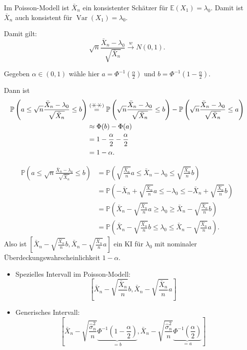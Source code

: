 \documentclass{tstextbook}
\DeclareMathOperator{\Var}{Var}
\newcommand{\E}{\mathbb E}
\newcommand{\Prob}{\mathbb P}
\begin{document}
\begin{example}
	
	Im Poisson-Modell ist $ \bar{X}_n $ ein konsistenter Schätzer für $ \E(X_1) = \lambda_0 $. Damit ist $ \bar{X}_n $ auch konsistent für $ \Var(X_1) = \lambda_0 $. 
	
	Damit gilt: 
	\[
	\sqrt{n} \frac{\bar{X}_n-\lambda_0}{\sqrt{\bar{X}_n}} \overset{w}{\longrightarrow} N(0,1). \tag{$\hexstar\hexstar$}
	\]
	
	Gegeben $ \alpha \in (0,1) $ wähle hier $ a = \Phi^{-1} \left(\frac{\alpha}{2}\right) $ und $ b = \Phi^{-1} \left( 1 - \frac{\alpha}{2} \right) $. 
	
	Dann ist 
	\[
	\begin{aligned}
		\Prob\left(a \le \sqrt{n} \frac{\bar{X}_n - \lambda_0}{\sqrt{\bar{X}_n}} \le b \right) & \overset{(\hexstar\hexstar)}{=} \Prob\left(\sqrt{n} \frac{\bar{X}_n - \lambda_0}{\sqrt{\bar{X}_n}} \le b \right) - \Prob\left(\sqrt{n} \frac{\bar{X}_n - \lambda_0}{\sqrt{\bar{X}_n}} \le a \right) \\
		& \approx \Phi (b) - \Phi (a) \\
		& = 1 - \frac{\alpha}{2} - \frac{\alpha}{2} \\
		& = 1 - \alpha.
	\end{aligned}
	\]
	
	\[
	\begin{aligned}
		\Prob\left(a \le \sqrt{n} \frac{\bar{X}_n - \lambda_0}{\sqrt{\bar{X}_n}} \le b \right) & = \Prob \left(\sqrt{\frac{\bar{X}_n}{n}} a \le \bar{X}_n - \lambda_0 \le \sqrt{\frac{\bar{X}_n}{n}} b \right) \\
		& = \Prob \left(- \bar{X}_n + \sqrt{\frac{\bar{X}_n}{n}} a \le  - \lambda_0 \le - \bar{X}_n + \sqrt{\frac{\bar{X}_n}{n}} b \right) \\
		& = \Prob \left(\bar{X}_n - \sqrt{\frac{\bar{X}_n}{n}} a \ge   \lambda_0 \ge  \bar{X}_n - \sqrt{\frac{\bar{X}_n}{n}} b \right) \\
		& = \Prob \left(\bar{X}_n - \sqrt{\frac{\bar{X}_n}{n}} b \le   \lambda_0 \le  \bar{X}_n - \sqrt{\frac{\bar{X}_n}{n}} a \right).
	\end{aligned}
	\]
	Also ist $ \left[\bar{X}_n - \sqrt{\frac{\bar{X}_n}{n}} b, \bar{X}_n - \sqrt{\frac{\bar{X}_n}{n}} a \right] $ ein KI für $ \lambda_0 $ mit nominaler Überdeckungswahrscheinlichkeit $ 1-\alpha $. 
	
	\begin{itemize}
		\item Spezielles Intervall im Poisson-Modell: 
		\[
		\left[\bar{X}_n - \sqrt{\frac{\bar{X}_n}{n}} b, \bar{X}_n - \sqrt{\frac{\bar{X}_n}{n}} a \right]
		\]
		
		\item Generisches Intervall: 
		\[
		\left[\bar{X}_n - \sqrt{\frac{\hat{\sigma}_n^2}{n}} \underbrace{\Phi^{-1}\left(1-\frac{\alpha}{2}\right)}_{=b}, \bar{X}_n - \sqrt{ \frac{\hat{\sigma}_n^2}{n}} \underbrace{\Phi^{-1}\left(\frac{\alpha}{2}\right)}_{=a} \right]
		\]
	\end{itemize}
	
\end{example}
\end{document}
